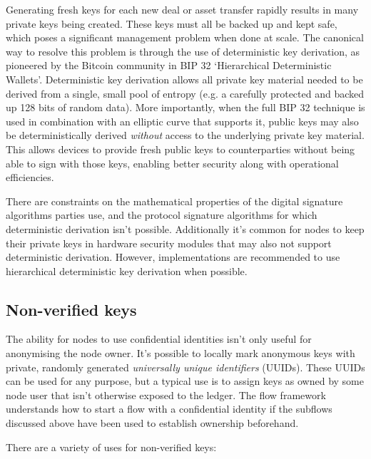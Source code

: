 \documentclass{article}
\begin{document}
Generating fresh keys for each new deal or asset transfer rapidly results in many private keys being created. These
keys must all be backed up and kept safe, which poses a significant management problem when done at scale. The
canonical way to resolve this problem is through the use of deterministic key derivation, as pioneered by the
Bitcoin community in BIP 32 `Hierarchical Deterministic Wallets'\cite{BIP32}. Deterministic key derivation allows
all private key material needed to be derived from a single, small pool of entropy (e.g. a carefully protected and
backed up 128 bits of random data). More importantly, when the full BIP 32 technique is used in combination with an
elliptic curve that supports it, public keys may also be deterministically derived \emph{without} access to the
underlying private key material. This allows devices to provide fresh public keys to counterparties without being
able to sign with those keys, enabling better security along with operational efficiencies.

There are constraints on the mathematical properties of the digital signature algorithms parties use, and the
protocol signature algorithms for which deterministic derivation isn't possible. Additionally it's common for nodes
to keep their private keys in hardware security modules that may also not support deterministic derivation.
However, implementations are recommended to use hierarchical deterministic key derivation when possible.


\subsection{Non-verified keys}\label{subsec:non-verified-keys}

The ability for nodes to use confidential identities isn't only useful for anonymising the node owner. It's
possible to locally mark anonymous keys with private, randomly generated \emph{universally unique identifiers}
(UUIDs). These UUIDs can be used for any purpose, but a typical use is to assign keys as owned by some node user
that isn't otherwise exposed to the ledger. The flow framework understands how to start a flow with a
confidential identity if the subflows discussed above have been used to establish ownership beforehand.

There are a variety of uses for non-verified keys:
\end{document}
